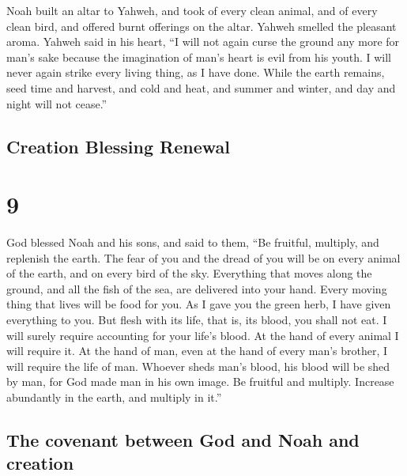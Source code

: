  Noah built an altar to Yahweh, and took of every clean
animal, and of every clean bird, and offered burnt offerings on the
altar.  Yahweh smelled the pleasant aroma. Yahweh said in
his heart, ``I will not again curse the ground any more for man's sake
because the imagination of man's heart is evil from his youth. I will
never again strike every living thing, as I have done. 
While the earth remains, seed time and harvest, and cold and heat, and
summer and winter, and day and night will not cease.''

\hypertarget{creation-blessing-renewal}{%
\subsection{Creation Blessing Renewal}\label{creation-blessing-renewal}}

\hypertarget{section-8}{%
\section{9}\label{section-8}}

 God blessed Noah and his sons, and said to them, ``Be
fruitful, multiply, and replenish the earth.  The fear of
you and the dread of you will be on every animal of the earth, and on
every bird of the sky. Everything that moves along the ground, and all
the fish of the sea, are delivered into your hand.  Every
moving thing that lives will be food for you. As I gave you the green
herb, I have given everything to you.  But flesh with its
life, that is, its blood, you shall not eat.  I will
surely require accounting for your life's blood. At the hand of every
animal I will require it. At the hand of man, even at the hand of every
man's brother, I will require the life of man.  Whoever
sheds man's blood, his blood will be shed by man, for God made man in
his own image.  Be fruitful and multiply. Increase
abundantly in the earth, and multiply in it.''

\hypertarget{the-covenant-between-god-and-noah-and-creation}{%
\subsection{The covenant between God and Noah and
creation}\label{the-covenant-between-god-and-noah-and-creation}}

